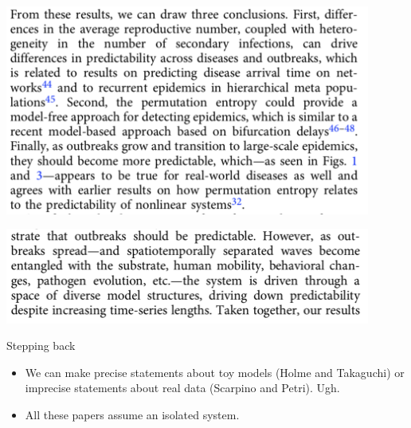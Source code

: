 \documentclass[aspectratio=169]{beamer}
\begin{document}
\begin{frame}

\begin{center}
\includegraphics[width = 0.9\textwidth]{figures/scarpino_on_2019_conclusions}
\end{center}

\end{frame}
\begin{frame}

\begin{center}
\includegraphics[width = 0.9\textwidth]{figures/scarpino_on_2019_stuff_changes}
\end{center}

\end{frame}
\begin{frame}

Stepping back
\begin{itemize}
\item We can make precise statements about toy models (Holme and Takaguchi) or imprecise statements about real data (Scarpino and Petri). Ugh.
\pause
\item All these papers assume an isolated system.
\end{itemize}

\end{frame}
\end{document}
